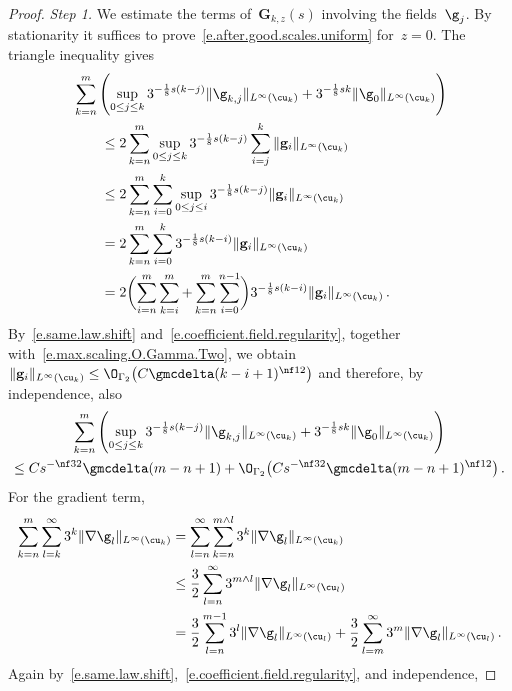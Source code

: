 \documentclass[11pt]{amsart}
\begin{document}
\begin{proof}
\emph{Step 1.} We estimate the terms of~$\mathbf G_{k,z}(s)$ involving the fields~$\g_j$. By stationarity it suffices to prove~\eqref{e.after.good.scales.uniform} for~$z=0$. The triangle inequality gives
\begin{align*}
	&
	\sum_{k=n}^m
	\left(
	\sup_{0\leq j \leq k}
	3^{-\frac{1}{8}s(k-j)} \| \g_{k,j} \|_{L^\infty(\cu_{k})}
	+3^{-\frac{1}{8}sk}\|\g_0\|_{L^\infty(\cu_k)}
	\right)
	\notag \\ & \qquad
	\leq
	2\sum_{k=n}^m
	\sup_{0\leq j \leq k}
	3^{-\frac{1}{8} s(k-j)}
	\sum_{i=j}^k
	\|  \mathbf{g}_i  \|_{L^{\infty}(\cu_k)}
	\notag \\ & \qquad
	\leq
	2\sum_{k=n}^m
	\sum_{i=0}^k
	\sup_{0\leq j \leq i}
	3^{-\frac{1}{8} s(k-j)}
	\|  \mathbf{g}_i  \|_{L^{\infty}(\cu_k)}
	\notag \\ & \qquad
	=
	2\sum_{k=n}^m
	\sum_{i=0}^k
	3^{-\frac{1}{8} s(k-i)}
	\|  \mathbf{g}_i  \|_{L^{\infty}(\cu_k)}
	\notag \\ & \qquad
	=
	2\biggl(
	\sum_{i=n}^m
	\sum_{k=i}^m
	+
	\sum_{k=n}^m \sum_{i=0}^{n-1}  \biggr)
	3^{-\frac{1}{8} s(k-i)}
	\|  \mathbf{g}_i  \|_{L^{\infty}(\cu_k)}
	\,.
\end{align*}
By~\eqref{e.same.law.shift} and~\eqref{e.coefficient.field.regularity}, together with~\eqref{e.max.scaling.O.Gamma.Two}, we obtain~$\|  \mathbf{g}_i  \|_{L^{\infty}(\cu_k)} \leq \O_{\Gamma_2}\bigl( C \gmcdelta (k-i+1)^{\nf 12} \bigr)$ and therefore, by independence, also
\begin{multline*}
	\sum_{k=n}^m
	\left(
	\sup_{0\leq j \leq k}
	3^{-\frac{1}{8}s(k-j)} \| \g_{k,j} \|_{L^\infty(\cu_{k})}
	+3^{-\frac{1}{8}sk}\|\g_0\|_{L^\infty(\cu_k)}
	\right)
	\\
	\leq
	C s^{-\nf 32} \gmcdelta(m-n+1)
	+
	\O_{\Gamma_2}\bigl( C s^{-\nf 32}  \gmcdelta (m-n+1)^{\nf 12} \bigr)
	\,.
\end{multline*}
For the gradient term,
\begin{align*}
	\sum_{k=n}^m
	\sum_{l=k}^\infty
	3^{k}
	\|  \nabla \g_l  \|_{L^{\infty}(\cu_k)}
	&
	=
	\sum_{l=n}^\infty
	\sum_{k=n}^{m\wedge l}
	3^{k}
	\|  \nabla \g_l  \|_{L^{\infty}(\cu_k)}
	\notag \\ &
	\leq
	\frac 32
	\sum_{l=n}^\infty
	3^{m\wedge l }
	\|  \nabla \g_l  \|_{L^{\infty}(\cu_l)}
	\notag \\ &
	=
	\frac 32
	\sum_{l=n}^{m-1}
	3^{l}
	\|  \nabla \g_l  \|_{L^{\infty}(\cu_l)}
	+
	\frac 32
	\sum_{l=m}^\infty
	3^{m}
	\|  \nabla \g_l  \|_{L^{\infty}(\cu_l)}
	\,.
\end{align*}
Again by~\eqref{e.same.law.shift},~\eqref{e.coefficient.field.regularity}, and independence,

\end{proof}
\end{document}
